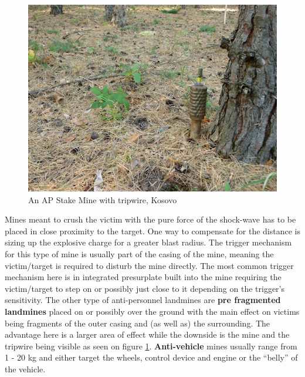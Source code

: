 \begin{figure}
\centering
\includegraphics[width=\linewidth]{00 - Images/evolution-landmines-to-ieds.png}
  \caption{An AP Stake Mine with tripwire, Kosovo \cite{LinternWebsite}}
  \label{fig:An AP Stake Mine with tripwire, Kosovo}
\end{figure}
Mines meant to crush the victim with the pure force of the shock-wave has to be placed in close proximity to the target. One way to compensate for the distance is sizing up the explosive charge for a greater blast radius. The trigger mechanism for this type of mine is usually part of the casing of the mine, meaning the victim/target is required to disturb the mine directly. The most common trigger mechanism here is in integrated presurplate built into the mine requiring the victim/target to step on or possibly just close to it depending on the trigger’s sensitivity. The other type of anti-personnel landmines are \textbf{pre fragmented landmines} placed on or possibly over the ground with the main effect on victims being fragments of the outer casing and (as well as) the surrounding. The advantage here is a larger area of effect while the downside is the mine and the tripwire being visible as seen on figure \ref{fig:An AP Stake Mine with tripwire, Kosovo}. \textbf{Anti-vehicle} mines usually range from 1 - 20 kg and either target the wheels, control device and engine or the “belly” of the vehicle. 


